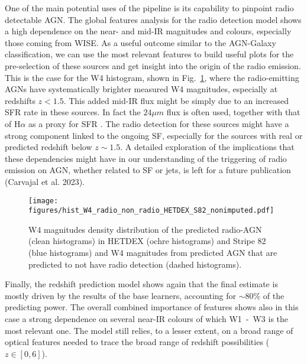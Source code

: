 \documentclass{aa}
\begin{document}
One of the main potential uses of the pipeline is its capability to pinpoint radio detectable AGN. The global features analysis for the radio detection model shows a high dependence on the near- and mid-IR magnitudes and colours, especially those coming from WISE. As a useful outcome similar to the AGN-Galaxy classification, we can use the most relevant features to build useful plots for the pre-selection of these sources and get insight into the origin of the radio emission. This is the case for the W4 histogram, shown in Fig.~\ref{fig:hist_W4_nonimputed_pred_radio_non_radio_AGN}, where the radio-emitting AGNs have systematically brighter measured W4 magnitudes, especially at redshifts ${z < 1.5}$. This added mid-IR flux might be simply due to an increased SFR rate in these sources. In fact the $24\mu m$ flux is often used, together with that of H$\alpha$ as a proxy for SFR \citep{2009ApJ...703.1672K}. The radio detection for these sources might have a strong component linked to the ongoing SF, especially for the sources with real or predicted redshift below ${z {\sim} 1.5}$. A detailed exploration of the implications that these dependencies might have in our understanding of the triggering of radio emission on AGN, whether related to SF or jets, is left for a future publication (Carvajal et al. 2023).


\begin{figure}
  \centering
    \texttt{[image: figures/hist\_W4\_radio\_non\_radio\_HETDEX\_S82\_nonimputed.pdf]}
  \caption{W4 magnitudes density distribution of the predicted radio-AGN  (clean histograms) in HETDEX (ochre histograms) and Stripe 82 (blue histograms) and W4 magnitudes from predicted AGN that are predicted to not have radio detection (dashed histograms).}
  \label{fig:hist_W4_nonimputed_pred_radio_non_radio_AGN}
\end{figure}

Finally, the redshift prediction model shows again that the final estimate is mostly driven by the results of the base learners, accounting for ${\sim} 80\%$ of the predicting power. The overall combined importance of features shows also in this case a strong dependence on several near-IR colours of which W1~-~W3 is the most relevant one. 
The model still relies, to a lesser extent, on a broad range of optical features needed to trace the broad range of redshift possibilities ($z \in [0,6]$).%
\end{document}
